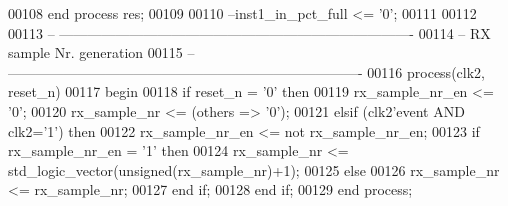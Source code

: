 \begin{DoxyCode}
00108    \textcolor{keywordflow}{end} \textcolor{keywordflow}{process} \textcolor{vhdlchar}{res};
00109    
00110 \textcolor{keyword}{   --inst1\_in\_pct\_full <= '0';}
00111 
00112 
00113 \textcolor{keyword}{-- ----------------------------------------------------------------------------}
00114 \textcolor{keyword}{-- RX sample Nr. generation}
00115 \textcolor{keyword}{-- ----------------------------------------------------------------------------    }
00116 \textcolor{keywordflow}{process}(clk2, reset_n)
00117 \textcolor{vhdlkeyword}{begin}
00118    \textcolor{keywordflow}{if} \textcolor{vhdlchar}{reset_n} \textcolor{vhdlchar}{=} \textcolor{vhdlchar}{'}\textcolor{vhdllogic}{}\textcolor{vhdllogic}{0}\textcolor{vhdlchar}{'} \textcolor{keywordflow}{then} 
00119       \textcolor{vhdlchar}{rx_sample_nr_en} \textcolor{vhdlchar}{<=} \textcolor{vhdlchar}{'}\textcolor{vhdllogic}{}\textcolor{vhdllogic}{0}\textcolor{vhdlchar}{'};
00120       \textcolor{vhdlchar}{rx_sample_nr} \textcolor{vhdlchar}{<=} \textcolor{vhdlchar}{(}\textcolor{keywordflow}{others} \textcolor{vhdlchar}{=}\textcolor{vhdlchar}{>} \textcolor{vhdlchar}{'}\textcolor{vhdllogic}{}\textcolor{vhdllogic}{0}\textcolor{vhdlchar}{'}\textcolor{vhdlchar}{)};
00121    \textcolor{keywordflow}{elsif} \textcolor{vhdlchar}{(}\textcolor{vhdlchar}{clk2}\textcolor{vhdlchar}{'}\textcolor{vhdlkeyword}{event} \textcolor{keywordflow}{AND} \textcolor{vhdlchar}{clk2}\textcolor{vhdlchar}{=}\textcolor{vhdlchar}{'}\textcolor{vhdllogic}{}\textcolor{vhdllogic}{1}\textcolor{vhdlchar}{'}\textcolor{vhdlchar}{)} \textcolor{keywordflow}{then} 
00122       \textcolor{vhdlchar}{rx_sample_nr_en} \textcolor{vhdlchar}{<=} \textcolor{keywordflow}{not} \textcolor{vhdlchar}{rx_sample_nr_en};
00123       \textcolor{keywordflow}{if} \textcolor{vhdlchar}{rx_sample_nr_en} \textcolor{vhdlchar}{=} \textcolor{vhdlchar}{'}\textcolor{vhdllogic}{}\textcolor{vhdllogic}{1}\textcolor{vhdlchar}{'} \textcolor{keywordflow}{then} 
00124          \textcolor{vhdlchar}{rx_sample_nr} \textcolor{vhdlchar}{<=} \textcolor{comment}{std\_logic\_vector}\textcolor{vhdlchar}{(}\textcolor{comment}{unsigned}\textcolor{vhdlchar}{(}\textcolor{vhdlchar}{rx_sample_nr}\textcolor{vhdlchar}{)}\textcolor{vhdlchar}{+}\textcolor{vhdllogic}{}\textcolor{vhdllogic}{1}\textcolor{vhdlchar}{)};
00125       \textcolor{keywordflow}{else} 
00126          \textcolor{vhdlchar}{rx_sample_nr} \textcolor{vhdlchar}{<=} \textcolor{vhdlchar}{rx_sample_nr};
00127       \textcolor{keywordflow}{end} \textcolor{keywordflow}{if};
00128    \textcolor{keywordflow}{end} \textcolor{keywordflow}{if};
00129 \textcolor{keywordflow}{end} \textcolor{keywordflow}{process};

\end{DoxyCode}
